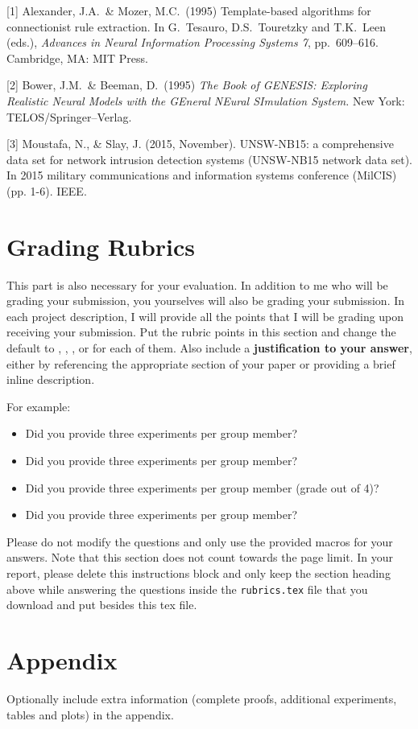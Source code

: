 \documentclass{article}
\begin{document}
{
\small


[1] Alexander, J.A.\ \& Mozer, M.C.\ (1995) Template-based algorithms for
connectionist rule extraction. In G.\ Tesauro, D.S.\ Touretzky and T.K.\ Leen
(eds.), {\it Advances in Neural Information Processing Systems 7},
pp.\ 609--616. Cambridge, MA: MIT Press.


[2] Bower, J.M.\ \& Beeman, D.\ (1995) {\it The Book of GENESIS: Exploring
  Realistic Neural Models with the GEneral NEural SImulation System.}  New York:
TELOS/Springer--Verlag.


[3] Moustafa, N., \& Slay, J. (2015, November). UNSW-NB15: a comprehensive data set for network intrusion detection systems (UNSW-NB15 network data set). In 2015 military communications and information systems conference (MilCIS) (pp. 1-6). IEEE.



}



\section*{Grading Rubrics}
This part is also necessary for your evaluation. In addition to me who will be grading your submission, you yourselves will also be grading your submission. In each project description, I will provide all the points that I will be grading upon receiving your submission. 
Put the rubric points in this section and change the default \answerTODO{} to \answerYes{},
\answerNo{}, \answerGrade{}, or \answerNA{} for each of them. Also include a {\bf
justification to your answer}, either by referencing the appropriate section of
your paper or providing a brief inline description.

For example:
\begin{itemize}
  \item Did you provide three experiments per group member? 
  \item Did you provide three experiments per group member? 
  \item Did you provide three experiments per group member (grade out of 4)? 
  \item Did you provide three experiments per group member? 
\end{itemize}
Please do not modify the questions and only use the provided macros for your
answers.  Note that this section does not count towards the page
limit.  In your report, please delete this instructions block and only keep the
section heading above while answering the questions inside the \texttt{rubrics.tex} file that you download and put besides this tex file.



\appendix


\section{Appendix}\label{sec:appendix}
Optionally include extra information (complete proofs, additional experiments, tables and plots) in the appendix.
\end{document}

